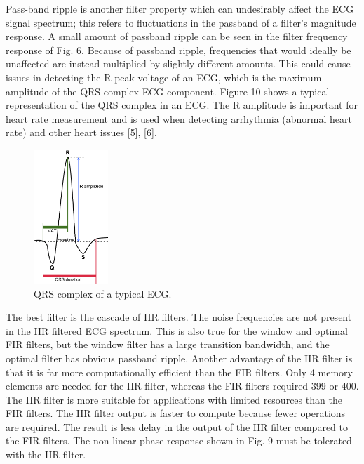\documentclass[12pt]{article}
\begin{document}
\noindent Pass-band ripple is another filter property which can undesirably affect the ECG signal
spectrum; this refers to fluctuations in the passband of a filter’s magnitude response. A small amount
of passband ripple can be seen in the filter frequency response of Fig. 6. Because of passband ripple,
frequencies that would ideally be unaffected are instead multiplied by slightly different amounts. This
could cause issues in detecting the R peak voltage of an ECG, which is the maximum amplitude of the QRS
complex ECG component. Figure 10 shows a typical representation of the QRS complex in an ECG. The R amplitude
is important for heart rate measurement and is used when detecting arrhythmia (abnormal heart rate) and other
heart issues [5], [6].\\

\begin{figure}[H]
    \centering
    \includegraphics[width=0.25\textwidth]{qrs.png}
    \caption{QRS complex of a typical ECG.}
    \label{fig:qrs}
\end{figure}

The best filter is the cascade of IIR filters. The noise frequencies are not present in the IIR filtered
ECG spectrum. This is also true for the window and optimal FIR filters, but the window filter has a large
transition bandwidth, and the optimal filter has obvious passband ripple. Another advantage of the IIR
filter is that it is far more computationally efficient than the FIR filters. Only 4 memory elements are
needed for the IIR filter, whereas the FIR filters required 399 or 400. The IIR filter is more suitable
for applications with limited resources than the FIR filters. The IIR filter output is faster to compute
because fewer operations are required. The result is less delay in the output of the IIR filter compared
to the FIR filters. The non-linear phase response shown in Fig. 9 must be tolerated with the IIR filter. 
\end{document}
